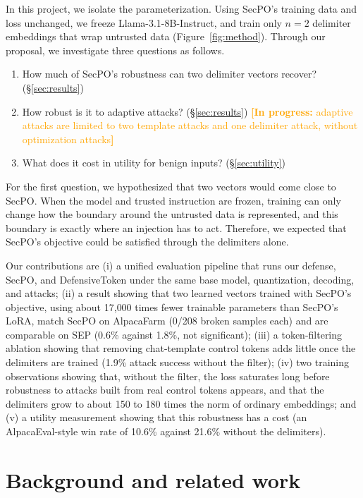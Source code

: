 \documentclass{article}
\newcommand{\inprogress}[1]{\textcolor{orange}{\textbf{[In progress:} #1\textbf{]}}}
\begin{document}
In this project, we isolate the parameterization. Using SecPO's training data and loss unchanged, we freeze Llama-3.1-8B-Instruct, and train only $n=2$ delimiter embeddings that wrap untrusted data (Figure~\ref{fig:method}). Through our proposal, we investigate three questions as follows.
\begin{enumerate}
  \item How much of SecPO's robustness can two delimiter vectors recover? (\S\ref{sec:results})
  \item How robust is it to adaptive attacks? (\S\ref{sec:results}) \inprogress{adaptive attacks are limited to two template attacks and one delimiter attack, without optimization attacks}
  \item What does it cost in utility for benign inputs? (\S\ref{sec:utility})
\end{enumerate}
For the first question, we hypothesized that two vectors would come close to SecPO. When the model and trusted instruction are frozen, training can only change how the boundary around the untrusted data is represented, and this boundary is exactly where an injection has to act. Therefore, we expected that SecPO's objective could be satisfied through the delimiters alone.

Our contributions are (i) a unified evaluation pipeline that runs our defense, SecPO, and DefensiveToken under the same base model, quantization, decoding, and attacks; (ii) a result showing that two learned vectors trained with SecPO's objective, using about 17{,}000 times fewer trainable parameters than SecPO's LoRA, match SecPO on AlpacaFarm (0/208 broken samples each) and are comparable on SEP (0.6\% against 1.8\%, not significant); (iii) a token-filtering ablation showing that removing chat-template control tokens adds little once the delimiters are trained (1.9\% attack success without the filter); (iv) two training observations showing that, without the filter, the loss saturates long before robustness to attacks built from real control tokens appears, and that the delimiters grow to about 150 to 180 times the norm of ordinary embeddings; and (v) a utility measurement showing that this robustness has a cost (an AlpacaEval-style win rate of 10.6\% against 21.6\% without the delimiters).

\section{Background and related work}
\label{sec:related}
\end{document}
